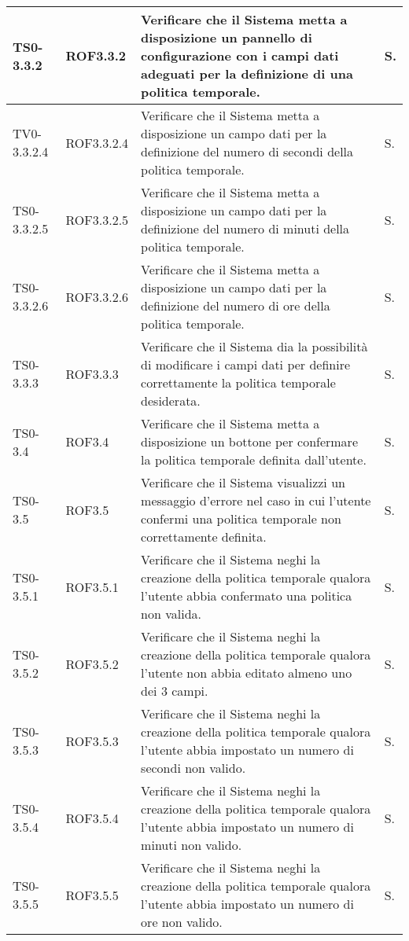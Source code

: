 \begin{longtable}{|C{.15\textwidth}|C{.14\textwidth}|m{.52\textwidth}|m{.08\textwidth}|}
\hline
TS0-3.3.2 & ROF3.3.2 & Verificare che il Sistema metta a disposizione un pannello di configurazione con i campi dati adeguati per la definizione di una politica temporale. & S. \\
\hline
{}TV0-3.3.2.4 & ROF3.3.2.4 & Verificare che il Sistema metta a disposizione un campo dati per la definizione del numero di secondi della politica temporale. & S. \\
\hline
TS0-3.3.2.5 & ROF3.3.2.5 & Verificare che il Sistema metta a disposizione un campo dati per la definizione del numero di minuti della politica temporale. & S. \\
\hline
{}TS0-3.3.2.6 & ROF3.3.2.6 & Verificare che il Sistema metta a disposizione un campo dati per la definizione del numero di ore della politica temporale. & S. \\
\hline
TS0-3.3.3 & ROF3.3.3 & Verificare che il Sistema dia la possibilità di modificare i campi dati per definire correttamente la politica temporale desiderata. & S. \\
\hline
{}TS0-3.4 & ROF3.4 & Verificare che il Sistema metta a disposizione un bottone per confermare la politica temporale definita dall'utente. & S. \\
\hline
TS0-3.5 & ROF3.5 & Verificare che il Sistema visualizzi un messaggio d'errore nel caso in cui l'utente confermi una politica temporale non correttamente definita. & S. \\
\hline
{}TS0-3.5.1 & ROF3.5.1 & Verificare che il Sistema neghi la creazione della politica temporale qualora l'utente abbia confermato una politica non valida. & S. \\
\hline
TS0-3.5.2 & ROF3.5.2 & Verificare che il Sistema neghi la creazione della politica temporale qualora l'utente non abbia editato almeno uno dei 3 campi. & S. \\
\hline
{}TS0-3.5.3 & ROF3.5.3 & Verificare che il Sistema neghi la creazione della politica temporale qualora l'utente abbia impostato un numero di secondi non valido. & S. \\
\hline
TS0-3.5.4 & ROF3.5.4 & Verificare che il Sistema neghi la creazione della politica temporale qualora l'utente abbia impostato un numero di minuti non valido. & S. \\
\hline
{}TS0-3.5.5 & ROF3.5.5 & Verificare che il Sistema neghi la creazione della politica temporale qualora l'utente abbia impostato un numero di ore non valido. & S. \\

\end{longtable}
